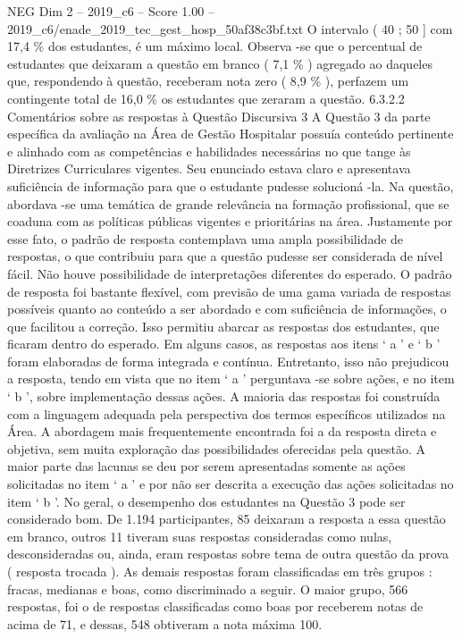 \begin{textsample}{NEG Dim 2 – 2019\_c6 – Score 1.00 – 2019\_c6/enade\_2019\_tec\_gest\_hosp\_50af38c3bf.txt}
O intervalo ( 40 ; 50 ] com 17,4 \% dos estudantes, é um máximo local.
Observa -se que o percentual de estudantes que deixaram a questão em branco ( 7,1 \% ) agregado ao daqueles que, respondendo à questão, receberam nota zero ( 8,9 \% ), perfazem um contingente total de 16,0 \% os estudantes que zeraram a questão. 6.3.2.2 Comentários sobre as respostas à Questão Discursiva 3 A Questão 3 da parte específica da avaliação na Área de Gestão Hospitalar possuía conteúdo pertinente e alinhado com as competências e habilidades necessárias no que tange às Diretrizes Curriculares vigentes.
Seu enunciado estava claro e apresentava suficiência de informação para que o estudante pudesse solucioná -la.
Na questão, abordava -se uma temática de grande relevância na formação profissional, que se coaduna com as políticas públicas vigentes e prioritárias na área.
Justamente por esse fato, o padrão de resposta contemplava uma ampla possibilidade de respostas, o que contribuiu para que a questão pudesse ser considerada de nível fácil.
Não houve possibilidade de interpretações diferentes do esperado.
O padrão de resposta foi bastante flexível, com previsão de uma gama variada de respostas possíveis quanto ao conteúdo a ser abordado e com suficiência de informações, o que facilitou a correção.
Isso permitiu abarcar as respostas dos estudantes, que ficaram dentro do esperado.
Em alguns casos, as respostas aos itens ‘ a ’ e ‘ b ’ foram elaboradas de forma integrada e contínua.
Entretanto, isso não prejudicou a resposta, tendo em vista que no item ‘ a ’ perguntava -se sobre ações, e no item ‘ b ’, sobre implementação dessas ações.
A maioria das respostas foi construída com a linguagem adequada pela perspectiva dos termos específicos utilizados na Área.
A abordagem mais frequentemente encontrada foi a da resposta direta e objetiva, sem muita exploração das possibilidades oferecidas pela questão.
A maior parte das lacunas se deu por serem apresentadas somente as ações solicitadas no item ‘ a ’ e por não ser descrita a execução das ações solicitadas no item ‘ b ’.
No geral, o desempenho dos estudantes na Questão 3 pode ser considerado bom.
De 1.194 participantes, 85 deixaram a resposta a essa questão em branco, outros 11 tiveram suas respostas consideradas como nulas, desconsideradas ou, ainda, eram respostas sobre tema de outra questão da prova ( resposta trocada ).
As demais respostas foram classificadas em três grupos : fracas, medianas e boas, como discriminado a seguir.
O maior grupo, 566 respostas, foi o de respostas classificadas como boas por receberem notas de acima de 71, e dessas, 548 obtiveram a nota máxima 100.

\end{textsample}

